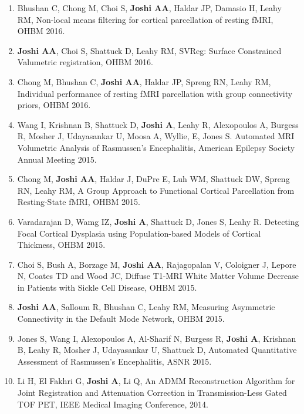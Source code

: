 \documentclass[overlapped,line,letterpaper]{res}
\begin{document}
\begin{resume}
\begin{enumerate}
     \item Bhushan C, Chong M, Choi S, \textbf{Joshi AA}, Haldar JP, Damasio H, Leahy RM, {Non-local means filtering for cortical parcellation of resting fMRI}, OHBM 2016.
     
     \item \textbf{Joshi AA}, Choi S, Shattuck D, Leahy RM, {SVReg: Surface Constrained Valumetric registration}, OHBM 2016.

    \item Chong M, Bhushan C, \textbf{Joshi AA}, Haldar JP, Spreng RN, Leahy RM, {Individual performance of resting fMRI parcellation with group connectivity priors}, OHBM 2016.
    
    \item Wang I, Krishnan B, Shattuck D, \textbf{Joshi A}, Leahy R, Alexopoulos A, Burgess R, Mosher J, Udayasankar U, Moosa A, Wyllie, E, Jones S. {Automated MRI Volumetric Analysis of Rasmussen's Encephalitis}, American Epilepsy Society Annual Meeting 2015.

    \item Chong M, \textbf{Joshi AA}, Haldar J, DuPre E, Luh WM, Shattuck DW, Spreng RN, Leahy RM, {A Group Approach to Functional Cortical Parcellation from Resting-State fMRI}, OHBM 2015.

    \item Varadarajan D, Wamg IZ, \textbf{Joshi A}, Shattuck D, Jones S, Leahy R. {Detecting Focal Cortical Dysplasia using Population-based Models of Cortical Thickness},  OHBM 2015.

    \item Choi S, Bush A, Borzage M, \textbf{Joshi AA}, Rajagopalan V, Coloigner J, Lepore N, Coates TD and Wood JC, {Diffuse T1-MRI White Matter Volume Decrease in Patients with Sickle Cell Disease}, OHBM 2015.

    \item \textbf{Joshi AA}, Salloum R, Bhushan C, Leahy RM, {Measuring Asymmetric Connectivity in the Default Mode Network}, OHBM 2015.

    \item Jones S, Wang I, Alexopoulos A, Al-Sharif N, Burgess R, \textbf{Joshi A}, Krishnan B, Leahy R, Mosher J, Udayasankar U, Shattuck D, {Automated Quantitative Assessment of Rasmussen's Encephalitis}, ASNR 2015.

    \item Li H, El Fakhri G, \textbf{Joshi A}, Li Q, {An ADMM Reconstruction Algorithm for Joint Registration and Attenuation Correction in Transmission-Less Gated TOF PET}, IEEE Medical Imaging Conference, 2014.



\end{enumerate}
\end{resume}
\end{document}
